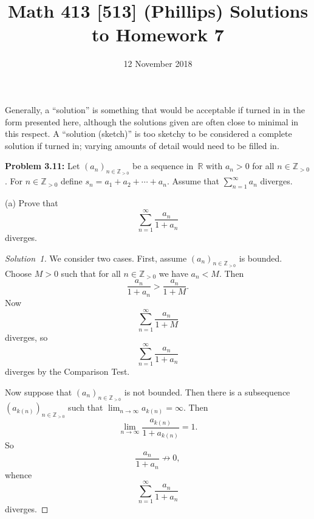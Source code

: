 \documentclass[10pt]{amsart}
\title{Math 413 [513] (Phillips) Solutions to Homework 7}
\date{12 November 2018}
\newcommand{\I}{\infty}
\newcommand{\limi}[1]{\lim_{{#1} \to \infty}}
\theoremstyle{definition}
\newcommand{\R}{{\mathbb{R}}}
\newcommand{\N}{{\mathbb{Z}}_{> 0}}
\begin{document}

\maketitle

Generally, a ``solution'' is something that would be acceptable
if turned in in the form presented here, although the solutions
given are often close to minimal in this respect.
A ``solution (sketch)'' is too sketchy to be considered a
complete solution if turned in;
varying amounts of detail would need to be filled in.

\vspace{3ex}

\noindent
{\textbf{Problem 3.11:}}
Let $(a_n)_{n \in \N}$ be a sequence in~$\R$
with $a_n > 0$ for all $n \in \N$.
For $n \in \N$
define $s_n = a_1 + a_2 + \cdots + a_n$.
Assume that $\sum_{n = 1}^{\infty} a_n$ diverges.

\vspace{1ex}

(a)
Prove that
\[
\sum_{n = 1}^{\infty} \frac{a_n}{1 + a_n}
\]
diverges.

\begin{proof}[Solution~1]
We consider two cases.
First,
assume $(a_n)_{n \in \N}$ is bounded.
Choose $M > 0$ such that for all $n \in \N$
we have $a_n < M$.
Then
\[
\frac{a_n}{1 + a_n} > \frac{a_n}{1 + M}.
\]
Now
\[
\sum_{n = 1}^{\infty} \frac{a_n}{1 + M}
\]
diverges,
so
\[
\sum_{n = 1}^{\infty} \frac{a_n}{1 + a_n}
\]
diverges by the Comparison Test.

Now suppose that $(a_n)_{n \in \N}$ is not bounded.
Then there is a subsequence $(a_{k (n)})_{n \in \N}$
such that $\limi{n} a_{k (n)} = \I$.
Then
\[
\limi{n} \frac{a_{k (n)}}{1 + a_{k (n)}} = 1.
\]
So
\[
\frac{a_n}{1 + a_n} \not\to 0,
\]
whence
\[
\sum_{n = 1}^{\infty} \frac{a_n}{1 + a_n}
\]
diverges.
\end{proof}
\end{document}

